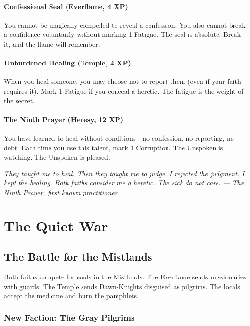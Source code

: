 \documentclass{book}
\newcommand{\citation}[1]{\textcolor{marginalia}{\small\textit{#1}}}
\begin{document}
\subsection{Confessional Seal (Everflame, 4 XP)}

You cannot be magically compelled to reveal a confession. You also cannot break a confidence voluntarily without marking 1 Fatigue. The seal is absolute. Break it, and the flame will remember.

\subsection{Unburdened Healing (Temple, 4 XP)}

When you heal someone, you may choose not to report them (even if your faith requires it). Mark 1 Fatigue if you conceal a heretic. The fatigue is the weight of the secret.

\subsection{The Ninth Prayer (Heresy, 12 XP)}

You have learned to heal without conditions---no confession, no reporting, no debt. Each time you use this talent, mark 1 Corruption. The Unspoken is watching. The Unspoken is pleased.

\citation{They taught me to heal. Then they taught me to judge. I rejected the judgment. I kept the healing. Both faiths consider me a heretic. The sick do not care. --- The Ninth Prayer, first known practitioner}

\part{The Quiet War}

\chapter{The Battle for the Mistlands}

Both faiths compete for souls in the Mistlands. The Everflame sends missionaries with guards. The Temple sends Dawn-Knights disguised as pilgrims. The locals accept the medicine and burn the pamphlets.

\section{New Faction: The Gray Pilgrims}
\end{document}
